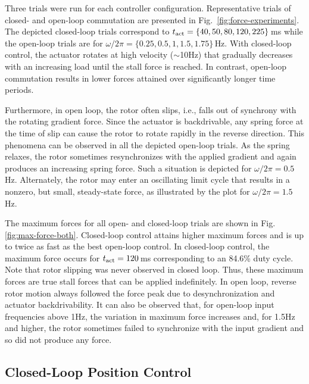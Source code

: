 \documentclass[journal]{IEEEtran}
\begin{document}
Three trials were run for each controller configuration. Representative trials of closed- and open-loop commutation are presented in Fig.\ \ref{fig:force-experiments}. The depicted closed-loop trials correspond to $t_\textnormal{act} = \{40, 50, 80, 120, 225\}\,$ms while the open-loop trials are for $\omega/2\pi = \{0.25, 0.5, 1, 1.5, 1.75\}\,$Hz. With closed-loop control, the actuator rotates at high velocity ($\sim$10Hz) that gradually decreases with an increasing load until the stall force is reached. In contrast, open-loop commutation results in lower forces attained over significantly longer time periods. 

Furthermore, in open loop, the rotor often slips, i.e., falls out of synchrony with the rotating gradient force. Since the actuator is backdrivable, any spring force at the time of slip can cause the rotor to rotate rapidly in the reverse direction. This phenomena can be observed in all the depicted open-loop trials. As the spring relaxes, the rotor sometimes resynchronizes with the applied gradient and again produces an increasing spring force. Such a situation is depicted for $\omega/2\pi=0.5$Hz. Alternately, the rotor may enter an oscillating limit cycle that results in a nonzero, but small, steady-state force, as illustrated by the plot for $\omega/2\pi=1.5$Hz.

The maximum forces for all open- and closed-loop trials are shown in Fig. \ref{fig:max-force-both}. Closed-loop control attains higher maximum forces and is up to twice as fast as the best open-loop control. In closed-loop control, the maximum force occurs for $t_\textnormal{act} = 120\,$ms corresponding to an 84.6\% duty cycle. Note that rotor slipping was never observed in closed loop. Thus, these maximum forces are true stall forces that can be applied indefinitely. In open loop, reverse rotor motion always followed the force peak due to desynchronization and actuator backdrivability. It can also be observed that, for open-loop input frequencies above 1Hz, the variation in maximum force increases and, for 1.5Hz and higher, the rotor sometimes failed to synchronize with the input gradient and so did not produce any force.



\subsection{Closed-Loop Position Control}
\label{subsec:ExpClosedLoopPositionControl}
\end{document}
